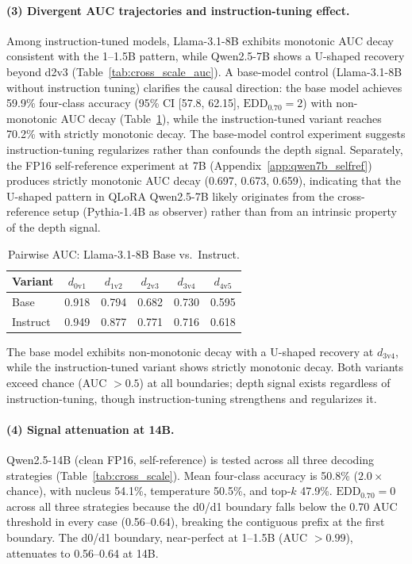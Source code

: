 \paragraph{(3) Divergent AUC trajectories and instruction-tuning effect.}
Among instruction-tuned models, Llama-3.1-8B exhibits monotonic AUC decay consistent with the 1--1.5B pattern, while Qwen2.5-7B shows a U-shaped recovery beyond d2v3 (Table~\ref{tab:cross_scale_auc}).
A base-model control (Llama-3.1-8B without instruction tuning) clarifies the causal direction: the base model achieves 59.9\% four-class accuracy (95\% CI [57.8, 62.15], $\mathrm{EDD}_{0.70}{=}2$) with non-monotonic AUC decay (Table~\ref{tab:llama3_base_auc}), while the instruction-tuned variant reaches 70.2\% with strictly monotonic decay.
The base-model control experiment suggests instruction-tuning regularizes rather than confounds the depth signal.
Separately, the FP16 self-reference experiment at 7B (Appendix~\ref{app:qwen7b_selfref}) produces strictly monotonic AUC decay (0.697, 0.673, 0.659), indicating that the U-shaped pattern in QLoRA Qwen2.5-7B likely originates from the cross-reference setup (Pythia-1.4B as observer) rather than from an intrinsic property of the depth signal.

\begin{table}[h]
\centering
\small
\caption{Pairwise AUC: Llama-3.1-8B Base vs.\ Instruct.}
\label{tab:llama3_base_auc}
\begin{tabular}{lccccc}
\toprule
Variant & $d_{0\text{v}1}$ & $d_{1\text{v}2}$ & $d_{2\text{v}3}$ & $d_{3\text{v}4}$ & $d_{4\text{v}5}$ \\
\midrule
Base & 0.918 & 0.794 & 0.682 & 0.730 & 0.595 \\
Instruct & 0.949 & 0.877 & 0.771 & 0.716 & 0.618 \\
\bottomrule
\end{tabular}
\end{table}

The base model exhibits non-monotonic decay with a U-shaped recovery at $d_{3\text{v}4}$, while the instruction-tuned variant shows strictly monotonic decay. Both variants exceed chance (AUC $> 0.5$) at all boundaries; depth signal exists regardless of instruction-tuning, though instruction-tuning strengthens and regularizes it.

\paragraph{(4) Signal attenuation at 14B.}
Qwen2.5-14B (clean FP16, self-reference) is tested across all three decoding strategies (Table~\ref{tab:cross_scale}).
Mean four-class accuracy is 50.8\% ($2.0{\times}$ chance), with nucleus 54.1\%, temperature 50.5\%, and top-$k$ 47.9\%.
$\mathrm{EDD}_{0.70}{=}0$ across all three strategies because the d0/d1 boundary falls below the 0.70 AUC threshold in every case (0.56--0.64), breaking the contiguous prefix at the first boundary.
The d0/d1 boundary, near-perfect at 1--1.5B (AUC ${>}0.99$), attenuates to 0.56--0.64 at 14B.

